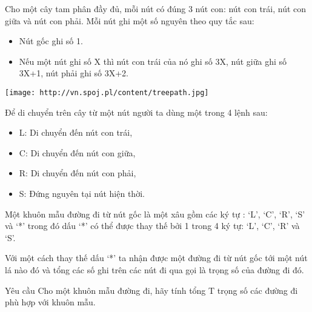 Cho một cây tam phân đầy đủ, mỗi nút có đúng 3 nút con: nút con trái, nút con giữa và nút con phải. Mỗi nút ghi một số nguyên theo quy tắc sau:  
\begin{itemize}
	\item     Nút gốc ghi số 1.   
	\item     Nếu một nút ghi số X thì nút con trái của nó ghi số 3X, nút giữa ghi số 3X+1, nút phải ghi số 3X+2.   
\end{itemize}
\texttt{[image: http://vn.spoj.pl/content/treepath.jpg]}

   Để di chuyển trên cây từ một nút người ta dùng một trong 4 lệnh sau:  
\begin{itemize}
	\item     L: Di chuyển đến nút con trái,   
	\item     C: Di chuyển đến nút con giữa,   
	\item     R: Di chuyển đến nút con phải,   
	\item     S: Đứng nguyên tại nút hiện thời.   
\end{itemize}

   Một khuôn mẫu đường đi từ nút gốc là một xâu gồm các ký tự : ‘L’, ‘C’, ‘R’, ‘S’ và ‘*’ trong đó dấu ‘*’ có thể được thay thế bởi 1 trong 4 ký tự: ‘L’, ‘C’, ‘R’ và ‘S’.  

   Với một cách thay thế dấu ‘*’ ta nhận được một đường đi từ nút gốc tới một nút lá nào đó và tổng các số ghi trên các nút đi qua gọi là trọng số của đường đi đó.  

Yêu cầu
Cho một khuôn mẫu đường đi, hãy tính tổng T trọng số các đường đi phù hợp với khuôn mẫu.